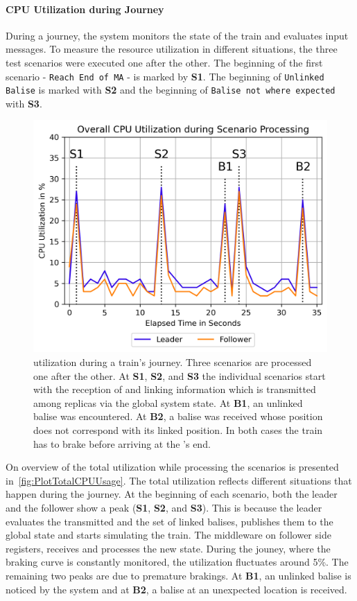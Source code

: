 \paragraph{CPU Utilization during Journey}

During a journey, the system monitors the state of the train and evaluates input messages.
To measure the resource utilization in different situations, the three test scenarios were executed one after the other.
The beginning of the first scenario - \texttt{Reach End of MA} - is marked by \textbf{S1}.
The beginning of \texttt{Unlinked Balise} is marked with \textbf{S2} and the beginning of \texttt{Balise not where expected} with \textbf{S3}.

\begin{figure}[!hb]
	\centering
	\includegraphics[width=0.8\linewidth]{images/plots/TotalCPUUsage}
	\caption{ utilization during a train's journey. Three scenarios are processed one after the other. At \textbf{S1}, \textbf{S2}, and \textbf{S3} the individual scenarios start with the reception of  and linking information which is transmitted among replicas via the global system state. At \textbf{B1}, an unlinked balise was encountered. At \textbf{B2}, a balise was received whose position does not correspond with its linked position. In both cases the train has to brake before arriving at the 's end.}
	\label{fig:PlotTotalCPUUsage}
\end{figure}

On overview of the total  utilization while processing the scenarios is presented in~\autoref{fig:PlotTotalCPUUsage}.
The total  utilization reflects different situations that happen during the journey.
At the beginning of each scenario, both the leader and the follower show a peak (\textbf{S1}, \textbf{S2}, and \textbf{S3}).
This is because the leader evaluates the transmitted  and the set of linked balises, publishes them to the global state and starts simulating the train.
The middleware on follower side registers, receives and processes the new state.
During the jouney, where the braking curve is constantly monitored, the utilization fluctuates around 5\%.
The remaining two peaks are due to premature brakings.
At \textbf{B1}, an unlinked balise is noticed by the system and at \textbf{B2}, a balise at an unexpected location is received.


